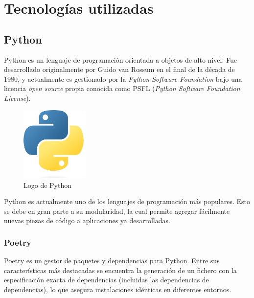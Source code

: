 
\chapter{Tecnologías utilizadas} %

\label{Chapter2} %


\section{Python}

Python es un lenguaje de programación orientada a objetos de alto nivel. Fue desarrollado originalmente por Guido van Rossum en el final de la década de 1980, y actualmente es gestionado por la \emph{Python Software Foundation} bajo una licencia \emph{open source} propia conocida como PSFL (\emph{Python Software Foundation License}). \emph{\parencite{Reference1}}

\begin{figure}[ht]
    \centering
    \includegraphics[width=0.3\textwidth]{Figures/python-logo}
    \decoRule
    \caption[Python (Logo)]{Logo de Python \emph{\parencite{Reference2}}}
    \label{fig:python-logo}
\end{figure}

Python es actualmente uno de los lenguajes de programación más populares. Esto se debe en gran parte a su modularidad, la cual permite agregar fácilmente nuevas piezas de código a aplicaciones ya desarrolladas. \emph{\parencite{Reference3}}

\subsection{Poetry}

Poetry es un gestor de paquetes y dependencias para Python. Entre sus características más destacadas se encuentra la generación de un fichero con la especificación exacta de dependencias (incluidas las dependencias de dependencias), lo que asegura instalaciones idénticas en diferentes entornos. \emph{\parencite{Reference6}}

